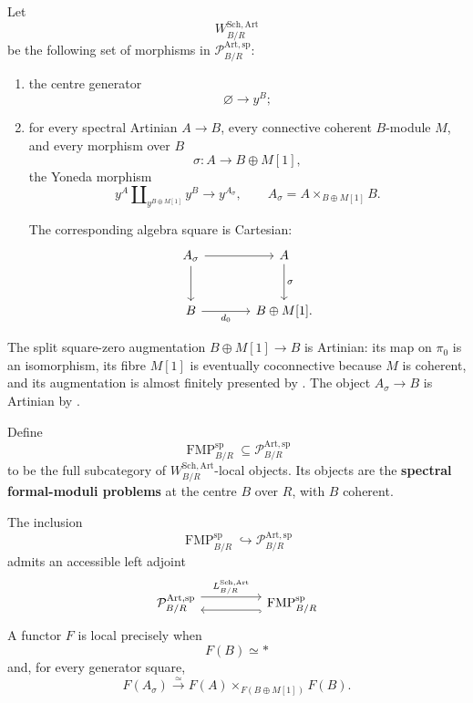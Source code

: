\begin{definition}
\label{def:artinian-schlessinger-generators}
Let
\[
    W^{\mathrm{Sch},\mathrm{Art}}_{B/R}
\]
be the following set of morphisms in
\(\mathcal P^{\mathrm{Art},\mathrm{sp}}_{B/R}\):
\begin{enumerate}[label=(\roman*)]
    \item the centre generator
    \[
        \varnothing\longrightarrow y^B;
    \]
    \item for every spectral Artinian \(A\to B\), every connective coherent
    \(B\)-module \(M\), and every morphism over \(B\)
    \[
        \sigma:A\longrightarrow B\oplus M[1],
    \]
    the Yoneda morphism
    \[
        y^A
        \amalg_{y^{B\oplus M[1]}}
        y^B
        \longrightarrow
        y^{A_\sigma},
        \qquad
        A_\sigma=A\times_{B\oplus M[1]}B.
    \]

    The corresponding algebra square is Cartesian:
    \[
    \begin{tikzcd}[column sep=large,row sep=large]
        A_\sigma \arrow[r] \arrow[d]
            & A \arrow[d,"\sigma"]
        \\
        B \arrow[r,"d_0"']
            & B\oplus M[1].
    \end{tikzcd}
    \]
\end{enumerate}
The split square-zero augmentation \(B\oplus M[1]\to B\) is Artinian: its map on
\(\pi_0\) is an isomorphism, its fibre \(M[1]\) is eventually
coconnective because \(M\) is coherent, and its augmentation is almost
finitely presented by . The object
\(A_\sigma\to B\) is Artinian by
.
\end{definition}

\begin{definition}
\label{def:spectral-formal-moduli-problem}
Define
\[
    \operatorname{FMP}^{\mathrm{sp}}_{B/R}
    \subseteq
    \mathcal P^{\mathrm{Art},\mathrm{sp}}_{B/R}
\]
to be the full subcategory of
\(W^{\mathrm{Sch},\mathrm{Art}}_{B/R}\)-local objects. Its objects are the
\textbf{spectral formal-moduli problems} at the centre \(B\) over \(R\), with \(B\) coherent.
\end{definition}

\begin{theorem}
\label{thm:artinian-schlessinger-reflector}
The inclusion
\[
    \operatorname{FMP}^{\mathrm{sp}}_{B/R}
    \hookrightarrow
    \mathcal P^{\mathrm{Art},\mathrm{sp}}_{B/R}
\]
admits an accessible left adjoint
\[
\begin{tikzcd}[column sep=huge]
    \mathcal P^{\mathrm{Art},\mathrm{sp}}_{B/R}
        \arrow[r,shift left=1.2ex,"L^{\mathrm{Sch},\mathrm{Art}}_{B/R}"]
        &
    \operatorname{FMP}^{\mathrm{sp}}_{B/R}
        \arrow[l,shift left=1.2ex,hook]
\end{tikzcd}
\]
A functor \(F\) is local precisely when
\[
    F(B)\simeq *
\]
and, for every generator square,
\[
    F(A_\sigma)
    \xrightarrow{\simeq}
    F(A)\times_{F(B\oplus M[1])}F(B).
\]
\end{theorem}

